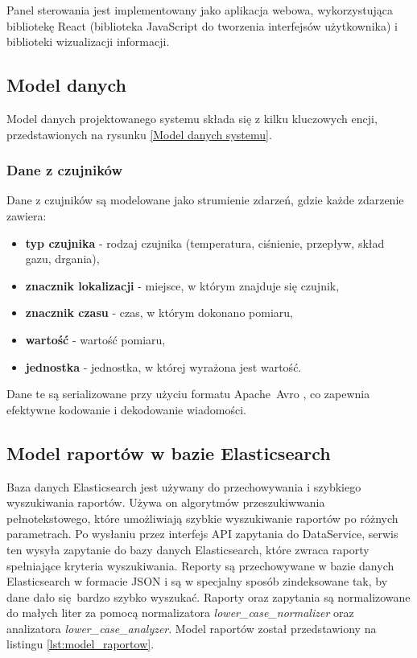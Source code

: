 \vspace{0.3em}

Panel sterowania jest implementowany jako aplikacja webowa, wykorzystująca bibliotekę React (biblioteka JavaScript do tworzenia interfejsów użytkownika) i biblioteki wizualizacji informacji.

\subsection{Model danych}
\label{subsec:model_danych}

Model danych projektowanego systemu składa się z kilku kluczowych encji, przedstawionych na rysunku \ref{Model danych systemu}.


\subsubsection{Dane z czujników}
\label{subsubsec:dane_czujnikow}

Dane z czujników są modelowane jako strumienie zdarzeń, gdzie każde zdarzenie zawiera:

\begin{itemize}
    \item \textbf{typ czujnika} - rodzaj czujnika (temperatura, ciśnienie, przepływ, skład gazu, drgania),
    \item \textbf{znacznik lokalizacji} - miejsce, w którym znajduje się czujnik,
    \item \textbf{znacznik czasu} - czas, w którym dokonano pomiaru,
    \item \textbf{wartość} - wartość pomiaru,
    \item \textbf{jednostka} - jednostka, w której wyrażona jest wartość.
\end{itemize}

\vspace{0.3em}

Dane te są serializowane przy użyciu formatu \mbox{Apache Avro} \cite{avro_documentation}, co zapewnia efektywne kodowanie i dekodowanie wiadomości.

\subsection{Model raportów w bazie Elasticsearch}
\label{subsec:model_raportow}

Baza danych Elasticsearch jest używany do przechowywania i szybkiego wyszukiwania raportów. Używa on algorytmów przeszukiwwania pełnotekstowego, które umożliwiają szybkie wyszukiwanie raportów po różnych parametrach. Po wysłaniu przez interfejs API zapytania do DataService, serwis ten wysyła zapytanie do bazy danych Elasticsearch, które zwraca raporty spełniające kryteria wyszukiwania. Reporty są przechowywane w bazie danych Elasticsearch w formacie JSON i są w specjalny sposób zindeksowane tak, by dane dało się bardzo szybko wyszukać. Raporty oraz zapytania są normalizowane do małych liter za pomocą normalizatora \textit{\mbox{lower\_case\_normalizer}} oraz analizatora \textit{\mbox{lower\_case\_analyzer}}. Model raportów został przedstawiony na listingu \ref{lst:model_raportow}.

